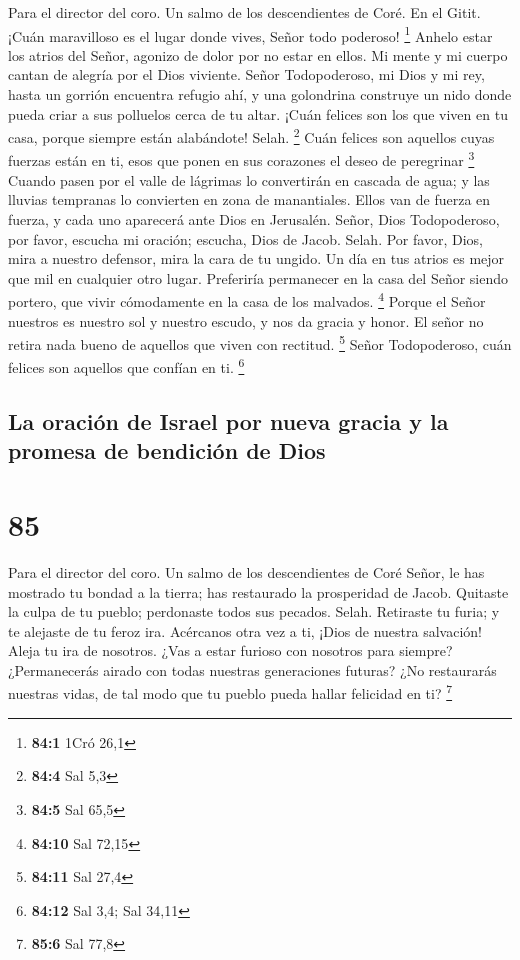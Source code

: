 Para el director del coro. Un salmo de los descendientes de Coré. En el
Gitit.  ¡Cuán maravilloso es el lugar donde vives, Señor
todo poderoso! \footnote{\textbf{84:1} 1Cró 26,1}  Anhelo
estar los atrios del Señor, agonizo de dolor por no estar en ellos. Mi
mente y mi cuerpo cantan de alegría por el Dios viviente. 
Señor Todopoderoso, mi Dios y mi rey, hasta un gorrión encuentra refugio
ahí, y una golondrina construye un nido donde pueda criar a sus
polluelos cerca de tu altar.  ¡Cuán felices son los que
viven en tu casa, porque siempre están alabándote! Selah. \footnote{\textbf{84:4}
  Sal 5,3}  Cuán felices son aquellos cuyas fuerzas están en
ti, esos que ponen en sus corazones el deseo de peregrinar \footnote{\textbf{84:5}
  Sal 65,5}  Cuando pasen por el valle de lágrimas lo
convertirán en cascada de agua; y las lluvias tempranas lo convierten en
zona de manantiales.  Ellos van de fuerza en fuerza, y cada
uno aparecerá ante Dios en Jerusalén.  Señor, Dios
Todopoderoso, por favor, escucha mi oración; escucha, Dios de Jacob.
Selah.  Por favor, Dios, mira a nuestro defensor, mira la
cara de tu ungido.  Un día en tus atrios es mejor que mil
en cualquier otro lugar. Preferiría permanecer en la casa del Señor
siendo portero, que vivir cómodamente en la casa de los malvados.
\footnote{\textbf{84:10} Sal 72,15}  Porque el Señor
nuestros es nuestro sol y nuestro escudo, y nos da gracia y honor. El
señor no retira nada bueno de aquellos que viven con rectitud.
\footnote{\textbf{84:11} Sal 27,4}  Señor Todopoderoso,
cuán felices son aquellos que confían en ti. \footnote{\textbf{84:12}
  Sal 3,4; Sal 34,11}

\hypertarget{la-oraciuxf3n-de-israel-por-nueva-gracia-y-la-promesa-de-bendiciuxf3n-de-dios}{%
\subsection{La oración de Israel por nueva gracia y la promesa de
bendición de
Dios}\label{la-oraciuxf3n-de-israel-por-nueva-gracia-y-la-promesa-de-bendiciuxf3n-de-dios}}

\hypertarget{section-84}{%
\section{85}\label{section-84}}

Para el director del coro. Un salmo de los descendientes de Coré
 Señor, le has mostrado tu bondad a la tierra; has
restaurado la prosperidad de Jacob.  Quitaste la culpa de tu
pueblo; perdonaste todos sus pecados. Selah.  Retiraste tu
furia; y te alejaste de tu feroz ira.  Acércanos otra vez a
ti, ¡Dios de nuestra salvación! Aleja tu ira de nosotros. 
¿Vas a estar furioso con nosotros para siempre? ¿Permanecerás airado con
todas nuestras generaciones futuras?  ¿No restaurarás
nuestras vidas, de tal modo que tu pueblo pueda hallar felicidad en ti?
\footnote{\textbf{85:6} Sal 77,8}

